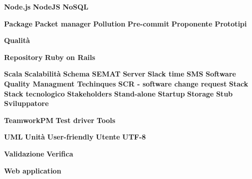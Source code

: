 
\textbf{Node.js}
\textbf{NodeJS}
\textbf{NoSQL}


\textbf{Package}
\textbf{Packet manager}
\textbf{Pollution}
\textbf{Pre-commit}
\textbf{Proponente}
\textbf{Prototipi}


\textbf{Qualità}


\textbf{Repository}
\textbf{Ruby on Rails}


\textbf{Scala}
\textbf{Scalabilità}
\textbf{Schema}
\textbf{SEMAT}
\textbf{Server}
\textbf{Slack time}
\textbf{SMS}
\textbf{Software Quality Managment Techinques}
\textbf{SCR - software change request}
\textbf{Stack}
\textbf{Stack tecnologico}
\textbf{Stakeholders}
\textbf{Stand-alone}
\textbf{Startup}
\textbf{Storage}
\textbf{Stub}
\textbf{Sviluppatore}


\textbf{TeamworkPM}
\textbf{Test driver}
\textbf{Tools}


\textbf{UML}
\textbf{Unità}
\textbf{User-friendly}
\textbf{Utente}
\textbf{UTF-8}


\textbf{Validazione}
\textbf{Verifica}


\textbf{Web application}

\appendix
%


